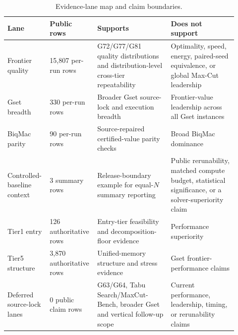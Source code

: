 \documentclass[11pt]{article}
\begin{document}
\begin{table}[tbp]
\centering
\caption{Evidence-lane map and claim boundaries.}
\label{tab:lanemap}
\footnotesize
\begin{tabular}{@{}L{0.16\linewidth}L{0.17\linewidth}L{0.31\linewidth}L{0.28\linewidth}@{}}
\toprule
Lane & Public rows & Supports & Does not support \\
\midrule
Frontier quality & 15,807 per-run rows & G72/G77/G81 quality distributions and distribution-level cross-tier repeatability & Optimality, speed, energy, paired-seed equivalence, or global Max-Cut leadership \\
Gset breadth & 330 per-run rows & Broader Gset source-lock and execution breadth & Frontier-value leadership across all Gset instances \\
BiqMac parity & 90 per-run rows & Source-repaired certified-value parity checks & Broad BiqMac dominance \\
Controlled-baseline context & 3 summary rows & Release-boundary example for equal-$N$ summary reporting & Public rerunability, matched compute budget, statistical significance, or a solver-superiority claim \\
Tier1 entry & 126 authoritative rows & Entry-tier feasibility and decomposition-floor evidence & Performance superiority \\
Tier5 structure & 3,870 authoritative rows & Unified-memory structure and stress evidence & Gset frontier-performance claims \\
Deferred source-lock lanes & 0 public claim rows & G63/G64, Tabu Search/MaxCut-Bench, broader Gset and vertical follow-up scope & Current performance, leadership, timing, or rerunability claims \\
\bottomrule
\end{tabular}
\end{table}
\end{document}
